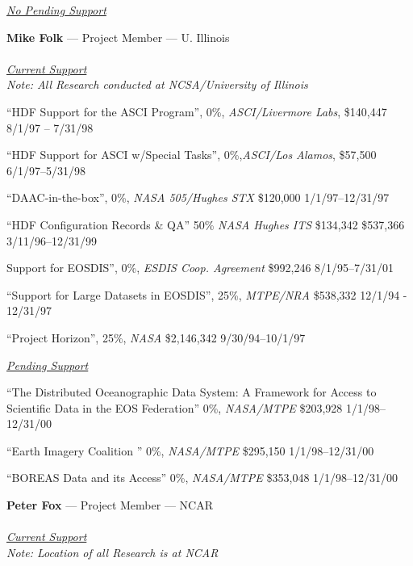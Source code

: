 \documentclass[12pt]{article}
\begin{document}
\begin{center}
{\large \underline{\it No Pending Support}}\\
\end{center}

\bigskip

\begin{center}
{\large {\bf Mike Folk} --- Project Member --- U. Illinois \\
\ \\
\vspace{.08in} \underline {\it Current Support}}\\
\vspace{.08in} {\small \it Note: All Research conducted at NCSA/University of
  Illinois }\\ 
\end{center}
\Hpar ``HDF Support for the ASCI Program'', 0\%, {\em ASCI/Livermore Labs},
\$140,447  8/1/97 -- 7/31/98

\Hpar ``HDF Support for ASCI w/Special Tasks'', 0\%,{\em ASCI/Los Alamos}, \$57,500 6/1/97--5/31/98

\Hpar ``DAAC-in-the-box'', 0\%, {\em NASA 505/Hughes STX} \$120,000
1/1/97--12/31/97

\Hpar ``HDF Configuration Records \& QA'' 50\% {\em NASA  Hughes ITS} \$134,342
\$537,366  3/11/96--12/31/99

Support for EOSDIS'', 0\%, {\em ESDIS Coop. Agreement} \$992,246
8/1/95--7/31/01

\Hpar ``Support for Large Datasets in EOSDIS'', 25\%, {\em MTPE/NRA}
\$538,332 12/1/94 - 12/31/97       

\Hpar ``Project Horizon'',  25\%, {\em NASA} \$2,146,342 9/30/94--10/1/97

\begin{center}
{\large \underline{\it Pending Support}}\\
\end{center}
\Hpar ``The Distributed Oceanographic Data System: A Framework for Access to
Scientific Data in the EOS Federation'' 0\%, {\em NASA/MTPE} \$203,928
1/1/98--12/31/00

\Hpar ``Earth Imagery Coalition '' 0\%, {\em NASA/MTPE} \$295,150
1/1/98--12/31/00 

\Hpar ``BOREAS Data and its Access'' 0\%, {\em NASA/MTPE} \$353,048
1/1/98--12/31/00

\bigskip

\begin{center}
{\large {\bf Peter Fox} --- Project Member --- NCAR \\
\ \\
\vspace{.08in} \underline {\it Current Support}}\\
\vspace{.08in} {\small {\it Note:  Location of all Research is at \ac{NCAR}}}
\end{center}
\end{document}
